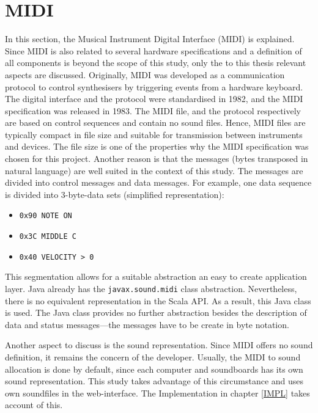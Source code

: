 \section{MIDI}
\label{THEO_MIDI}
In this section, the Musical Instrument Digital Interface (MIDI) is explained. Since MIDI is also related to several hardware specifications and a definition of all components is beyond the scope of this study, only the to this thesis relevant aspects are discussed. Originally, MIDI was developed as a communication protocol to control synthesisers by triggering events from a hardware keyboard.\cite{Manning2013} The digital interface and the protocol were standardised in 1982, and the MIDI specification was released in 1983.\cite{MIDIManufacturersAssociation} The MIDI file, and the protocol respectively are based on control sequences and contain no sound files. Hence, MIDI files are typically compact in file size and suitable for transmission between instruments and devices. The file size is one of the properties why the MIDI specification was chosen for this project. Another reason is that the messages (bytes transposed in natural language) are well suited in the context of this study. The messages are divided into control messages and data messages. For example, one data sequence is divided into 3-byte-data sets (simplified representation):

\begin{itemize}
\item\texttt{0x90 NOTE ON} 
\item\texttt{0x3C MIDDLE C} 
\item\texttt{0x40 VELOCITY > 0} 
\end{itemize}

This segmentation allows for a suitable abstraction an easy to create application layer. Java already has the \texttt{javax.sound.midi} class abstraction. Nevertheless, there is no equivalent representation in the Scala API. As a result, this Java class is used. The Java class provides no further abstraction besides the description of data and status messages—the messages have to be create in byte notation.

Another aspect to discuss is the sound representation. Since MIDI offers no sound definition, it remains the concern of the developer. Usually, the MIDI to sound allocation is done by default, since each computer and soundboards has its own sound representation. This study takes advantage of this circumstance and uses own soundfiles in the web-interface. The Implementation in chapter \ref{IMPL} takes account of this. 


























